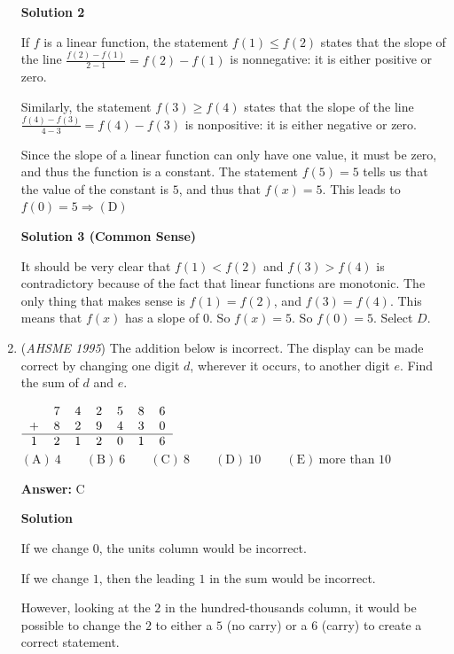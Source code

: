 \begin{enumerate}
\textbf{Solution 2}

If $f$ is a linear function, the statement $f(1) \leq f(2)$ states that the slope of the line $\frac{f(2) - f(1)}{2 - 1} = f(2) - f(1)$ is nonnegative:  it is either positive or zero.

 Similarly, the statement $f(3) \geq f(4)$ states that the slope of the line $\frac{f(4) - f(3)}{4 - 3} = f(4) - f(3)$ is nonpositive:  it is either negative or zero.

 Since the slope of a linear function can only have one value, it must be zero, and thus the function is a constant.  The statement $f(5) = 5$ tells us that the value of the constant is $5$, and thus that $f(x) = 5$.  This leads to $f(0)=5\Rightarrow \mathrm{(D)}$




\textbf{Solution 3 (Common Sense)}

It should be very clear that $f(1)<f(2)$ and $f(3)>f(4)$ is contradictory because of the fact that linear functions are monotonic. The only thing that makes sense is $f(1)=f(2)$, and $f(3)=f(4)$. This means that $f(x)$ has a slope of $0$. So $f(x)=5$. So $f(0)=5$. Select $\boxed{D}$. 

 


	\item (\textit{AHSME 1995}) The addition below is incorrect. The display can be made correct by changing one digit $d$, wherever it occurs, to another digit $e$. Find the sum of $d$ and $e$.


 $\begin{tabular}{ccccccc} & 7 & 4 & 2 & 5 & 8 & 6 \\ + & 8 & 2 & 9 & 4 & 3 & 0 \\ \hline 1 & 2 & 1 & 2 & 0 & 1 & 6 \end{tabular}$
$\mathrm{(A) \ 4 } \qquad \mathrm{(B) \ 6 } \qquad \mathrm{(C) \ 8 } \qquad \mathrm{(D) \ 10 } \qquad \mathrm{(E) \ \text{more than 10} }$

 \textbf{Answer: }C



\textbf{Solution}

If we change $0$, the units column would  be incorrect. 

 If we change $1$, then the leading $1$ in the sum would be incorrect.

 However, looking at the $2$ in the hundred-thousands column, it would be possible to change the $2$ to either a $5$ (no carry) or a $6$ (carry) to create a correct statement.  


\end{enumerate}
